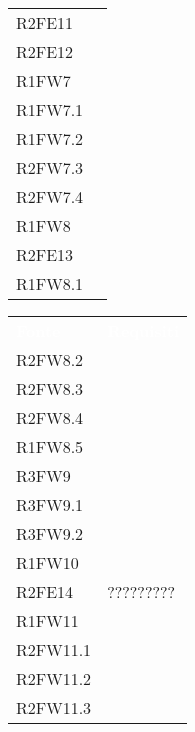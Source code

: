 \begin{table}[!htbp]
\begin{tabular}[t]{ m{}<{\centering}  m{}<{\centering} }
	R2FE11 & \Ns \\
	 
	R2FE12 & \Ns \\			
	 
	R1FW7 & \So \\	
	
	R1FW7.1 & \So \\

	R1FW7.2 & \So \\
	
	R2FW7.3 & \So \\
	
	R2FW7.4 & \So \\		
	
	R1FW8 & \Ns \\		
	
	R2FE13 & \Ns \\	
	 
	R1FW8.1 & \Ns \\	

\end{tabular}
\begin{tabular}[t]{ m{}<{\centering}  m{}<{\centering} }
	\rowcolor{darkblue}
	\textcolor{white}{\textbf{Fonte}} &\textcolor{white}{\textbf{Requisiti}}\\ 
	 
	R2FW8.2 & \Ns \\	
	 
	R2FW8.3 & \Ns \\	
	 
	R2FW8.4 & \Ns \\	 
	 
	R1FW8.5 & \Ns \\	 
	 
	R3FW9 & \Ns \\	
	 
	R3FW9.1& \Ns \\	 
	 
	R3FW9.2& \Ns \\	  
	 
	R1FW10 & \So \\	 
	 
	R2FE14& ????????? \\	 
	 	 
	R1FW11& \So \\	 	
	
	R2FW11.1 & \So \\
 	
	R2FW11.2 & \So \\
 	
	R2FW11.3 & \So \\
 

\end{tabular}
\end{table}
